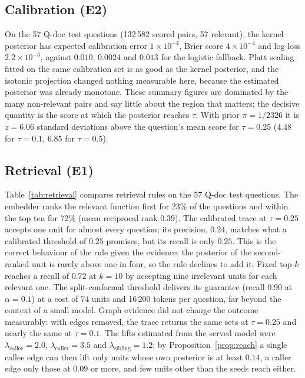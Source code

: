 \documentclass[10pt,twocolumn]{article}
\theoremstyle{definition}
\theoremstyle{remark}
\begin{document}
\subsection{Calibration (E2)}
On the 57 Q-doc test questions (132\,582 scored pairs, 57 relevant), the kernel posterior has expected calibration error $1\times10^{-4}$, Brier score $4\times10^{-4}$ and log loss $2.2\times10^{-3}$, against $0.010$, $0.0024$ and $0.013$ for the logistic fallback.
Platt scaling fitted on the same calibration set is as good as the kernel posterior, and the isotonic projection changed nothing measurable here, because the estimated posterior was already monotone.
These summary figures are dominated by the many non-relevant pairs and say little about the region that matters; the decisive quantity is the score at which the posterior reaches $\tau$.
With prior $\pi=1/2326$ it is $z=6.06$ standard deviations above the question's mean score for $\tau=0.25$ ($4.48$ for $\tau=0.1$, $6.85$ for $\tau=0.5$).

\subsection{Retrieval (E1)}
Table~\ref{tab:retrieval} compares retrieval rules on the 57 Q-doc test questions.
The embedder ranks the relevant function first for 23\% of the questions and within the top ten for 72\% (mean reciprocal rank 0.39).
The calibrated trace at $\tau=0.25$ accepts one unit for almost every question; its precision, $0.24$, matches what a calibrated threshold of $0.25$ promises, but its recall is only $0.25$.
This is the correct behaviour of the rule given the evidence: the posterior of the second-ranked unit is rarely above one in four, so the rule declines to add it.
Fixed top-$k$ reaches a recall of 0.72 at $k=10$ by accepting nine irrelevant units for each relevant one.
The split-conformal threshold delivers its guarantee (recall 0.90 at $\alpha=0.1$) at a cost of 74 units and 16\,200 tokens per question, far beyond the context of a small model.
Graph evidence did not change the outcome measurably: with edges removed, the trace returns the same sets at $\tau=0.25$ and nearly the same at $\tau=0.1$.
The lifts estimated from the served model were $\lambda_{\text{callee}}=2.0$, $\lambda_{\text{caller}}=3.5$ and $\lambda_{\text{sibling}}=1.2$; by Proposition~\ref{prop:reach} a single callee edge can then lift only units whose own posterior is at least $0.14$, a caller edge only those at $0.09$ or more, and few units other than the seeds reach either.
\end{document}
